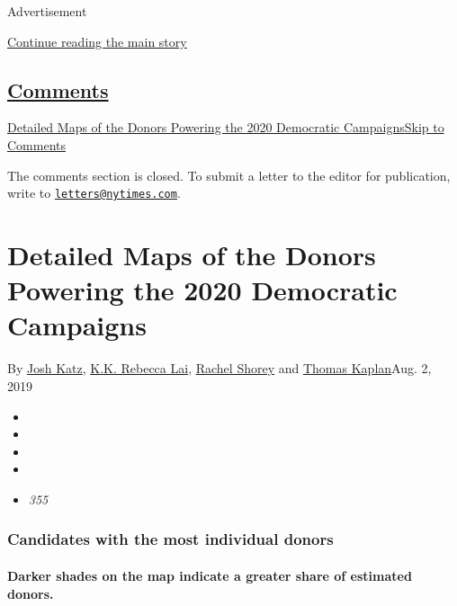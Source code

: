 Advertisement

\protect\hyperlink{after-top}{Continue reading the main story}

\hypertarget{comments}{%
\subsection{\texorpdfstring{\protect\hyperlink{commentsContainer}{Comments}}{Comments}}\label{comments}}

\href{}{Detailed Maps of the Donors Powering the 2020 Democratic
Campaigns}\href{}{Skip to Comments}

The comments section is closed. To submit a letter to the editor for
publication, write to
\href{mailto:letters@nytimes.com}{\nolinkurl{letters@nytimes.com}}.

\hypertarget{detailed-maps-of-the-donors-powering-the-2020-democratic-campaigns}{%
\section{Detailed Maps of the Donors Powering the 2020 Democratic
Campaigns}\label{detailed-maps-of-the-donors-powering-the-2020-democratic-campaigns}}

By \href{https://www.nytimes.com/by/josh-katz}{Josh Katz},
\href{https://www.nytimes.com/by/kk-rebecca-lai}{K.K. Rebecca Lai},
\href{https://www.nytimes.com/by/rachel-shorey}{Rachel Shorey} and
\href{https://www.nytimes.com/by/thomas-kaplan}{Thomas Kaplan}Aug. 2,
2019

\begin{itemize}
\item
\item
\item
\item
\item
  \emph{355}
\end{itemize}

\hypertarget{candidates-with-the-most-individual-donors}{%
\subsubsection{Candidates with the most individual
donors}\label{candidates-with-the-most-individual-donors}}

\hypertarget{darker-shades-on-the-map-indicate-a-greater-share-of-estimated-donors}{%
\paragraph{Darker shades on the map indicate a greater share of
estimated
donors.}\label{darker-shades-on-the-map-indicate-a-greater-share-of-estimated-donors}}

